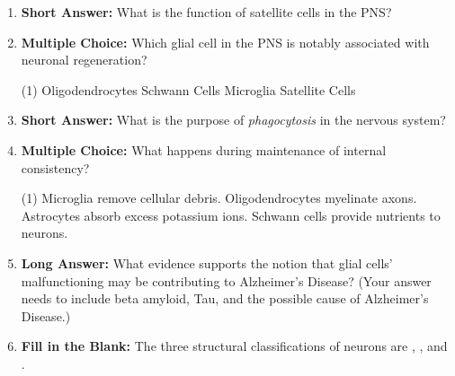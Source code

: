\begin{enumerate}[label=\textbf{Q2.1.\arabic*}]
            \begin{tasks}[label=(\Alph*), label-width=1.5em, item-indent=1.7em](1)
                  \task Astrocytes
                  \task Ependymal Glia
                  \task Schwann Cells
                  \task Microglia
            \end{tasks}
      \item \textbf{Short Answer:} What is the function of satellite cells in the PNS? \\
      \item \textbf{Multiple Choice:} Which glial cell in the PNS is notably associated with neuronal regeneration?
            \begin{tasks}[label=(\Alph*), label-width=1.5em, item-indent=1.7em](1)
                  \task Oligodendrocytes
                  \task Schwann Cells
                  \task Microglia
                  \task Satellite Cells
            \end{tasks}

      \item \textbf{Short Answer:} What is the purpose of \textit{phagocytosis} in the nervous system? \\

      \item \textbf{Multiple Choice:} What happens during maintenance of internal consistency?
            \begin{tasks}[label=(\Alph*), label-width=1.5em, item-indent=1.7em](1)
                  \task Microglia remove cellular debris.
                  \task Oligodendrocytes myelinate axons.
                  \task Astrocytes absorb excess potassium ions.
                  \task Schwann cells provide nutrients to neurons.
            \end{tasks}

      \item \textbf{Long Answer:} What evidence supports the notion that glial cells' malfunctioning may be contributing to Alzheimer's Disease? (Your answer needs to include beta amyloid, Tau, and the possible cause of Alzheimer's Disease.) \\

      \item \textbf{Fill in the Blank:} The three structural classifications of neurons are \underline{\hspace{3cm}}, \underline{\hspace{3cm}}, and \underline{\hspace{3cm}}. \\
\end{enumerate}

